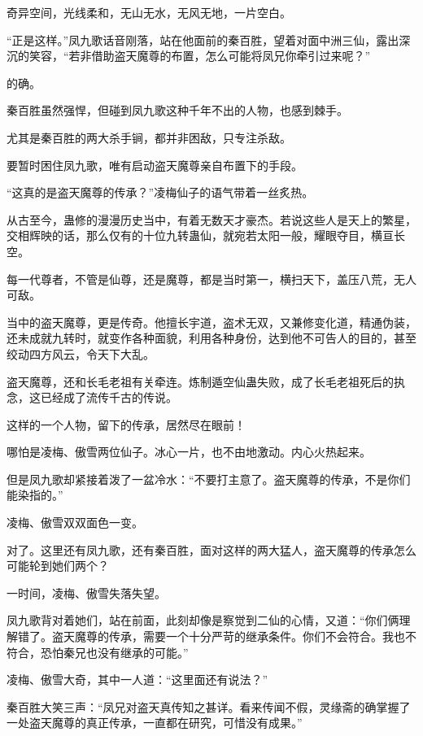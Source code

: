 
\begin{this_body}

奇异空间，光线柔和，无山无水，无风无地，一片空白。

“正是这样。”凤九歌话音刚落，站在他面前的秦百胜，望着对面中洲三仙，露出深沉的笑容，“若非借助盗天魔尊的布置，怎么可能将凤兄你牵引过来呢？”

的确。

秦百胜虽然强悍，但碰到凤九歌这种千年不出的人物，也感到棘手。

尤其是秦百胜的两大杀手锏，都并非困敌，只专注杀敌。

要暂时困住凤九歌，唯有启动盗天魔尊亲自布置下的手段。

“这真的是盗天魔尊的传承？”凌梅仙子的语气带着一丝炙热。

从古至今，蛊修的漫漫历史当中，有着无数天才豪杰。若说这些人是天上的繁星，交相辉映的话，那么仅有的十位九转蛊仙，就宛若太阳一般，耀眼夺目，横亘长空。

每一代尊者，不管是仙尊，还是魔尊，都是当时第一，横扫天下，盖压八荒，无人可敌。

当中的盗天魔尊，更是传奇。他擅长宇道，盗术无双，又兼修变化道，精通伪装，还未成就九转时，就变作各种面貌，利用各种身份，达到他不可告人的目的，甚至绞动四方风云，令天下大乱。

盗天魔尊，还和长毛老祖有关牵连。炼制遁空仙蛊失败，成了长毛老祖死后的执念，这已经成了流传千古的传说。

这样的一个人物，留下的传承，居然尽在眼前！

哪怕是凌梅、傲雪两位仙子。冰心一片，也不由地激动。内心火热起来。

但是凤九歌却紧接着泼了一盆冷水：“不要打主意了。盗天魔尊的传承，不是你们能染指的。”

凌梅、傲雪双双面色一变。

对了。这里还有凤九歌，还有秦百胜，面对这样的两大猛人，盗天魔尊的传承怎么可能轮到她们两个？

一时间，凌梅、傲雪失落失望。

凤九歌背对着她们，站在前面，此刻却像是察觉到二仙的心情，又道：“你们俩理解错了。盗天魔尊的传承，需要一个十分严苛的继承条件。你们不会符合。我也不符合，恐怕秦兄也没有继承的可能。”

凌梅、傲雪大奇，其中一人道：“这里面还有说法？”

秦百胜大笑三声：“凤兄对盗天真传知之甚详。看来传闻不假，灵缘斋的确掌握了一处盗天魔尊的真正传承，一直都在研究，可惜没有成果。”


\end{this_body}
